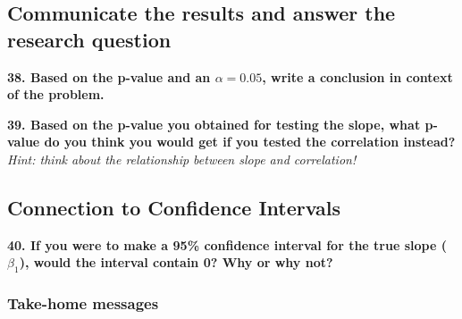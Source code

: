 \documentclass[
  letterpaper,
  DIV=11,
  numbers=noendperiod]{scrartcl}
\begin{document}
\hypertarget{communicate-the-results-and-answer-the-research-question}{%
\subsection{Communicate the results and answer the research
question}\label{communicate-the-results-and-answer-the-research-question}}

\textbf{38. Based on the p-value and an \(\alpha = 0.05\), write a
conclusion in context of the problem.}



\vspace{0.5cm}

\textbf{39. Based on the p-value you obtained for testing the slope,
what p-value do you think you would get if you tested the correlation
instead?} \emph{Hint: think about the relationship between slope and
correlation!}


\vspace{0.5cm}

\hypertarget{connection-to-confidence-intervals}{%
\subsection{Connection to Confidence
Intervals}\label{connection-to-confidence-intervals}}

\textbf{40. If you were to make a 95\% confidence interval for the true
slope (\(\beta_1\)), would the interval contain 0? Why or why not?}


\vspace{0.5cm}

\newpage

\hypertarget{take-home-messages}{%
\subsubsection{Take-home messages}\label{take-home-messages}}
\end{document}
